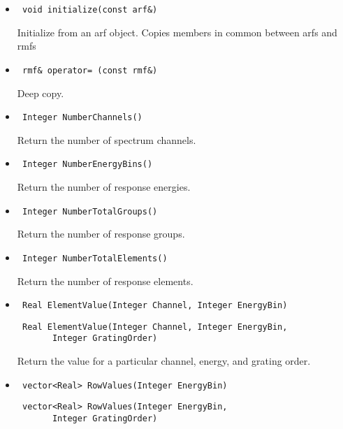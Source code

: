 \documentclass[11pt]{book}
\begin{document}
\begin{itemize}
\item  \begin{verbatim} void initialize(const arf&) \end{verbatim}

          Initialize from an arf object. Copies members in common between arfs and rmfs

\item  \begin{verbatim} rmf& operator= (const rmf&) \end{verbatim}  

          Deep copy.

\item  \begin{verbatim} Integer NumberChannels() \end{verbatim}

          Return the number of spectrum channels.

\item  \begin{verbatim} Integer NumberEnergyBins() \end{verbatim}
  
          Return the number of response energies. 

\item  \begin{verbatim} Integer NumberTotalGroups() \end{verbatim}
  
          Return the number of response groups. 

\item  \begin{verbatim} Integer NumberTotalElements() \end{verbatim}
  
          Return the number of response elements. 

\item  \begin{verbatim} Real ElementValue(Integer Channel, Integer EnergyBin) \end{verbatim}
       \begin{verbatim} Real ElementValue(Integer Channel, Integer EnergyBin,
       Integer GratingOrder) \end{verbatim}

          Return the value for a particular channel, energy, and
          grating order.

\item  \begin{verbatim} vector<Real> RowValues(Integer EnergyBin) \end{verbatim}
       \begin{verbatim} vector<Real> RowValues(Integer EnergyBin,
       Integer GratingOrder) \end{verbatim}


\end{itemize}
\end{document}
